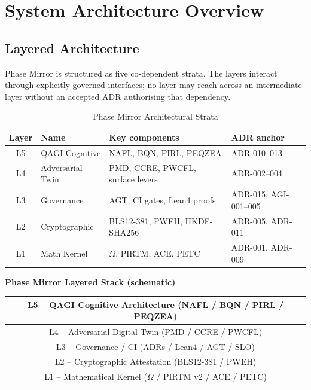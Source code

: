 \documentclass[12pt,a4paper]{article}
\theoremstyle{definition}
\theoremstyle{plain}
\theoremstyle{remark}
\begin{document}
\section{System Architecture Overview}
\label{sec:arch}

\subsection{Layered Architecture}

Phase Mirror is structured as five co-dependent strata. The layers interact
through explicitly governed interfaces; no layer may reach across an
intermediate layer without an accepted ADR authorising that dependency.

\begin{table}[h!]
\centering
\caption{Phase Mirror Architectural Strata}
\begin{tabular}{clll}
\toprule
\textbf{Layer} & \textbf{Name} & \textbf{Key components} & \textbf{ADR anchor} \\
\midrule
L5 & QAGI Cognitive   & NAFL, BQN, PIRL, PEQZEA            & ADR-010--013 \\
L4 & Adversarial Twin & PMD, CCRE, PWCFL, surface levers    & ADR-002--004 \\
L3 & Governance       & AGT, CI gates, Lean4 proofs         & ADR-015, AGI-001--005 \\
L2 & Cryptographic    & BLS12-381, PWEH, HKDF-SHA256        & ADR-005, ADR-011 \\
L1 & Math Kernel      & $\Omega$, PIRTM, ACE, PETC          & ADR-001, ADR-009 \\
\bottomrule
\end{tabular}
\end{table}

\begin{mdframed}[linecolor=multBlue,linewidth=1pt]
\begin{center}
\textbf{Phase Mirror Layered Stack (schematic)}\\[0.4em]
\begin{tabular}{|c|}
\hline
L5 -- QAGI Cognitive Architecture (NAFL / BQN / PIRL / PEQZEA) \\
\hline
L4 -- Adversarial Digital-Twin (PMD / CCRE / PWCFL) \\
\hline
L3 -- Governance / CI (ADRs / Lean4 / AGT / SLO) \\
\hline
L2 -- Cryptographic Attestation (BLS12-381 / PWEH) \\
\hline
L1 -- Mathematical Kernel ($\Omega$ / PIRTM v2 / ACE / PETC) \\
\hline
\end{tabular}
\end{center}
\end{mdframed}
\end{document}

